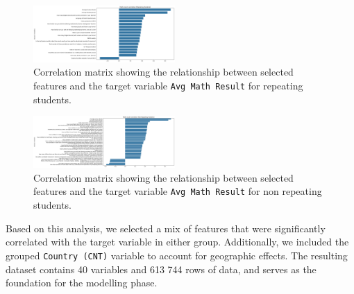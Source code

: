 \begin{figure}
    \centering
    \includegraphics[width=0.48\textwidth]{figures/Q1_repratingcorrelations.png}
    \caption{Correlation matrix showing the relationship between selected features and the target variable \texttt{Avg Math Result} for repeating students.}
    \label{fig:correlation_chart_repeating}
\end{figure}


\begin{figure}
    \centering
    \includegraphics[width=0.48\textwidth]{figures/Q1_nonrepeatingcorrelations.png}
    \caption{Correlation matrix showing the relationship between selected features and the target variable \texttt{Avg Math Result} for non repeating students.}
    \label{fig:correlation_chart_not_repeating}
\end{figure}


Based on this analysis, we selected a mix of features that were significantly correlated with the target variable in either group. Additionally, we included the grouped \texttt{Country (CNT)} variable to account for geographic effects.
The resulting dataset contains 40 variables and 613 744 rows of data, and serves as the foundation for the modelling phase.
